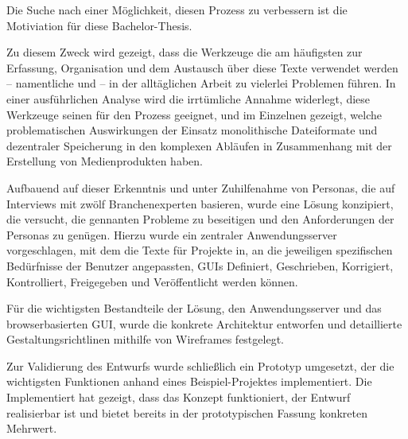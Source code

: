 \documentclass[11pt,a4paper]{article}
\begin{document}
Die Suche nach einer Möglichkeit, diesen Prozess zu verbessern ist die Motiviation für diese Bachelor-Thesis. 

Zu diesem Zweck wird gezeigt, dass die Werkzeuge die am häufigsten zur Erfassung, Organisation und dem Austausch über diese Texte verwendet werden -- namentliche  und  -- in der alltäglichen Arbeit zu vielerlei Problemen führen. In einer ausführlichen Analyse wird die irrtümliche Annahme widerlegt, diese Werkzeuge seinen für den Prozess geeignet, und im Einzelnen gezeigt, welche problematischen Auswirkungen der Einsatz monolithische Dateiformate und dezentraler Speicherung in den komplexen Abläufen in Zusammenhang mit der Erstellung von Medienprodukten haben.

Aufbauend auf dieser Erkenntnis und unter Zuhilfenahme von Personas, die auf Interviews mit zwölf Branchenexperten basieren, wurde eine Lösung konzipiert, die versucht, die gennanten Probleme zu beseitigen und den Anforderungen der Personas zu genügen. Hierzu wurde ein zentraler Anwendungsserver vorgeschlagen, mit dem die Texte für Projekte in, an die jeweiligen spezifischen Bedürfnisse der Benutzer angepassten, GUIs Definiert, Geschrieben, Korrigiert, Kontrolliert, Freigegeben und Veröffentlicht werden können.

Für die wichtigsten Bestandteile der Lösung, den Anwendungsserver und das browserbasierten GUI, wurde die konkrete Architektur entworfen und detaillierte Gestaltungsrichtlinen mithilfe von Wireframes festgelegt.

Zur Validierung des Entwurfs wurde schließlich ein Prototyp umgesetzt, der die wichtigsten Funktionen anhand eines Beispiel-Projektes implementiert. Die Implementiert hat gezeigt, dass das Konzept funktioniert, der Entwurf realisierbar ist und bietet bereits in der prototypischen Fassung konkreten Mehrwert.
\end{document}
